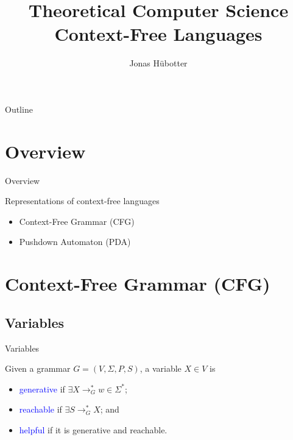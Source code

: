 \documentclass{beamer}
\title[Theoretical Computer Science]{Theoretical Computer Science \\ Context-Free Languages}
\author{Jonas Hübotter}
\date{}
\def\b{\textcolor{blue}}
\begin{document}
\begin{frame}
  \titlepage
\end{frame}

\begin{frame}{Outline}
 \tableofcontents[subsubsectionstyle=hide]
\end{frame}

\section{Overview}

\begin{frame}{Overview}
    \begin{block}{Representations of context-free languages}\pause
        \begin{itemize}
            \item Context-Free Grammar (CFG)\pause
            \item Pushdown Automaton (PDA)
        \end{itemize}
    \end{block}
\end{frame}

\section{Context-Free Grammar (CFG)}

\subsection{Variables}

\begin{frame}{Variables}
    \begin{definition}
        Given a grammar $G = (V, \Sigma, P, S)$, a variable $X \in V$ is
        \begin{itemize}
            \item \b{generative} if $\exists X \to_G^* w \in \Sigma^*$\pause;
            \item \b{reachable} if $\exists S \to_G^* X$\pause; and
            \item \b{helpful} if it is generative and reachable.
        \end{itemize}
    \end{definition}
\end{frame}
\end{document}
